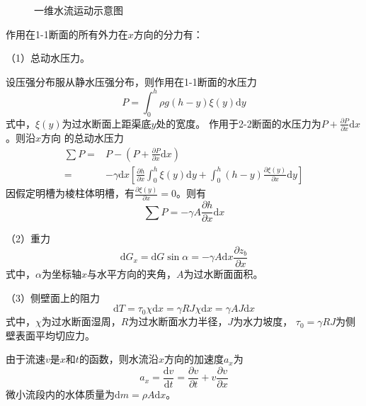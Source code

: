 \begin{figure}[htb]
  \centering
\caption{一维水流运动示意图}
\label{FgCGe_1DSwe_Force}
\end{figure}


作用在1-1断面的所有外力在$x$方向的分力有：

（1）总动水压力。

设压强分布服从静水压强分布，则作用在1-1断面的水压力
\begin{equation}
  P
  =
  \int_{0}^{h}\! \rho g(h-y)\xi(y)\mathrm{d}y
\end{equation}
式中，$\xi(y)$为过水断面上距渠底$y$处的宽度。
作用于2-2断面的水压力为$P+\frac{\partial P}{\partial x}\mathrm{d}x$。则沿$x$方向
的总动水压力
\begin{equation}
  \begin{aligned}
    \sum P
    =&
    P - \left(P+\frac {\partial P} {\partial x}\mathrm{d}x\right)
    \\
    =&
    -\gamma \mathrm{d}x
    \left[
      \frac{\partial h}{\partial x}
      \int_{0}^{h}\!
      \xi(y)
      \mathrm{d}y
      +
      \int_{0}^{h}\!
      (h-y)
      \frac{\partial \xi(y)}{\partial x}
      \mathrm{d}y
    \right]
  \end{aligned}
  \label{EqCGe_SVe_Me_Pressure}
\end{equation}
因假定明槽为棱柱体明槽，有$\frac{\partial \xi(y)}{\partial x}=0$。则有
\begin{equation}
  \sum P
  =
  -\gamma A\frac{\partial h}{\partial x}\mathrm{d}x
\end{equation}

（2）重力
\begin{equation}
  \mathrm{d}G_{x}
  =
  \mathrm{d}G\sin\alpha
  =
  -\gamma A\mathrm{d}x\frac{\partial z_{b}}{\partial x}
\end{equation}
式中，$\alpha$为坐标轴$x$与水平方向的夹角，$A$为过水断面面积。

（3）侧壁面上的阻力
\begin{equation}
  \mathrm{d}T
  =
  \tau_{0}\chi\mathrm{d}x
  =
  \gamma RJ\chi\mathrm{d}x
  =
  \gamma AJ\mathrm{d}x
\end{equation}
式中，$\chi$为过水断面湿周，$R$为过水断面水力半径，$J$为水力坡度，
$\tau_{0}=\gamma RJ$为侧壁表面平均切应力。

由于流速$v$是$x$和$t$的函数，则水流沿$x$方向的加速度$a_{x}$为
\begin{equation}
  a_{x}
  =
  \frac{\mathrm{d} v}{\mathrm{d} t}
  =
  \frac{\partial v}{\partial t}
  +
  v
  \frac{\partial v}{\partial x}
\end{equation}
微小流段内的水体质量为$\mathrm{d}m=\rho A\mathrm{d}x$。

